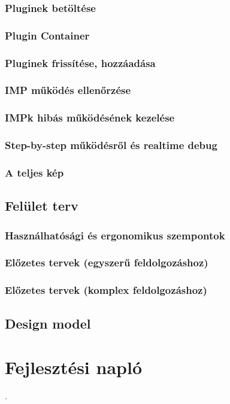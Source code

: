 \documentclass[a4paper,12pt,oneside]{report}
\begin{document}
\subsubsection{Pluginek betöltése}
\subsubsection{Plugin Container}
\subsubsection{Pluginek frissítése, hozzáadása}
\subsubsection{IMP működés ellenőrzése}
\subsubsection{IMPk hibás működésének kezelése}
\subsubsection{Step-by-step működésről és realtime debug}
\subsubsection{A teljes kép}

\subsection{Felület terv}
\subsubsection{Használhatósági és ergonomikus szempontok}
\subsubsection{Előzetes tervek (egyszerű feldolgozáshoz)}
\subsubsection{Előzetes tervek (komplex feldolgozáshoz)}


\subsection{Design model}


\section{Fejlesztési napló}
.
\end{document}
